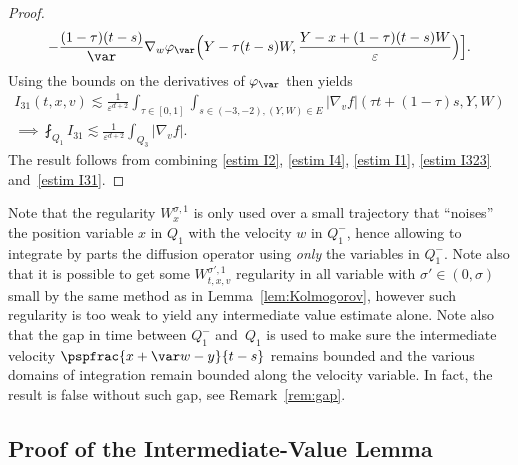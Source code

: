 \begin{proof}
\begin{multline*}
-\frac{(1-\tau)(t-s)}{\var}\nabla_w\varphi_\var
\Bigl(Y-\tau (t-s)W,\frac{Y-x+(1-\tau)(t-s)W}{\varepsilon}
\Bigr)\Bigr].
\end{multline*}
Using the bounds on the derivatives of $\varphi_\var$ then
yields
\begin{multline}
I_{31}(t,x,v) \lesssim \frac{1}{ \varepsilon^{d+2}}
\int_{\tau \in [0,1]}\int_{s\in
(-3,-2), (Y,W)\in E} |\nabla_v f|\left(\tau
t+(1-\tau)s,Y,W\right) \\
\implies
\label{estim I31}
\fint_{Q_1} I_{31} \lesssim
\frac{1}{ \varepsilon^{d+2}} \int_{Q_3} |\nabla_v f|.
\end{multline}
The result follows from combining \eqref{estim I2},
\eqref{estim I4}, \eqref{estim I1}, \eqref{estim I323}
and~\eqref{estim I31}.
\end{proof}

\begin{remark}
Note that the regularity $W^{\sigma,1}_{x}$ is only used over a
small trajectory that ``noises'' the position variable $x$ in
$Q_1$ with the velocity $w$ in $Q_1^-$, hence allowing to
integrate by parts the diffusion operator using \emph{only} the
variables in $Q_1^-$. Note also that it is possible to get some
$W^{\sigma',1}_{t,x,v}$ regularity in all variable with
$\sigma' \in (0,\sigma)$ small by the same method as in
Lemma~\ref{lem:Kolmogorov}, however such regularity is too weak
to yield any intermediate value estimate alone. Note also that
the gap in time between $Q_1^-$ and~$Q_1$ is used to make sure
the intermediate velocity $\pspfrac{x+\var w-y}{t-s}$ remains
bounded and the various domains of integration remain bounded
along the velocity variable. In fact, the result is false
without such gap, see Remark~\ref{rem:gap}.
\end{remark}

\subsection{Proof of the Intermediate-Value Lemma}
\label{ss:proof-ivl}

